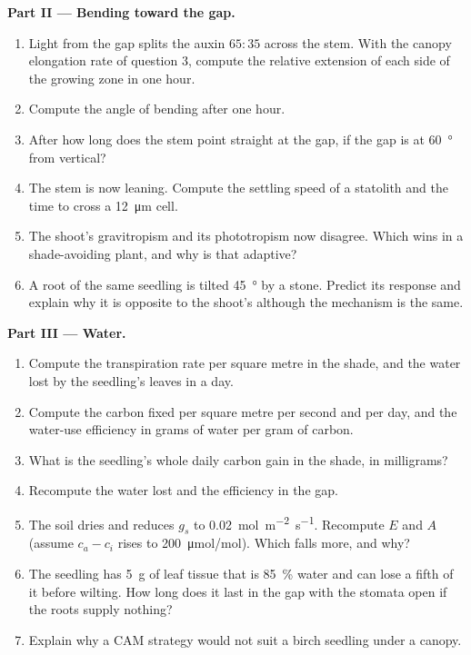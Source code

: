 \begin{problem}
\medskip
\noindent\textbf{Part II --- Bending toward the gap.}
\begin{enumerate}[resume]
  \item Light from the gap splits the auxin $65 : 35$ across the
        stem. With the canopy elongation rate of question 3, compute
        the relative extension of each side of the growing zone in
        one hour.
  \item Compute the angle of bending after one hour.
  \item After how long does the stem point straight at the gap, if
        the gap is at \qty{60}{\degree} from vertical?
  \item The stem is now leaning. Compute the settling speed of a
        statolith and the time to cross a \qty{12}{\micro m} cell.
  \item The shoot's gravitropism and its phototropism now disagree.
        Which wins in a shade-avoiding plant, and why is that
        adaptive?
  \item A root of the same seedling is tilted \qty{45}{\degree} by a
        stone. Predict its response and explain why it is opposite
        to the shoot's although the mechanism is the same.
\end{enumerate}

\medskip
\noindent\textbf{Part III --- Water.}
\begin{enumerate}[resume]
  \item Compute the transpiration rate per square metre in the shade,
        and the water lost by the seedling's leaves in a day.
  \item Compute the carbon fixed per square metre per second and per
        day, and the water-use efficiency in grams of water per gram
        of carbon.
  \item What is the seedling's whole daily carbon gain in the shade,
        in milligrams?
  \item Recompute the water lost and the efficiency in the gap.
  \item The soil dries and  reduces $g_s$ to
        \qty{0.02}{mol.m^{-2}.s^{-1}}. Recompute $E$ and $A$
        (assume $c_a - c_i$ rises to \qty{200}{\micro mol/mol}).
        Which falls more, and why?
  \item The seedling has \qty{5}{g} of leaf tissue that is \qty{85}{\%}
        water and can lose a fifth of it before wilting. How long
        does it last in the gap with the stomata open if the roots
        supply nothing?
  \item Explain why a CAM strategy would not suit a birch seedling
        under a canopy.
\end{enumerate}


\end{problem}
